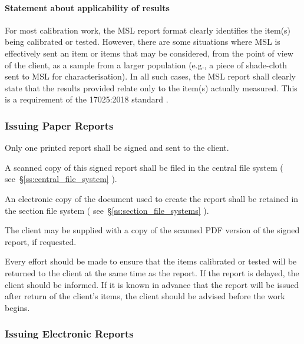 \paragraph{Statement about applicability of results}
For most calibration work, the MSL report format clearly identifies the item(s) being calibrated or tested. However, there are some situations where MSL is effectively sent an item or items that may be considered, from the point of view of the client, as a sample from a larger population (e.g., a piece of shade-cloth sent to MSL for characterisation). In all such cases, the MSL report shall clearly state that the results provided relate only to the item(s) actually measured. This is a requirement of the 17025:2018 standard \cite[clause 7.8.2.1~(l)]{ISO_17025}.      

\subsubsection{Issuing Paper Reports}

Only one printed report shall be signed and sent to the client. 

A scanned copy of this signed report shall be filed in the central file system ( see~\S\ref{ss:central_file_system} ). 

An electronic copy of the document used to create the report shall be retained in the section file system ( see~\S\ref{ss:section_file_systems} ). 
   
The client may be supplied with a copy of the scanned PDF version of the signed report, if requested.

Every effort should be made to ensure that the items calibrated or tested will be returned to the client at the same time as the report. If the report is delayed, the client should be informed. If it is known in advance that the report will be issued after return of the client's items, the client should be advised before the work begins.


\subsubsection{Issuing Electronic Reports}
\label{sss:issuing_electronic_reports}


